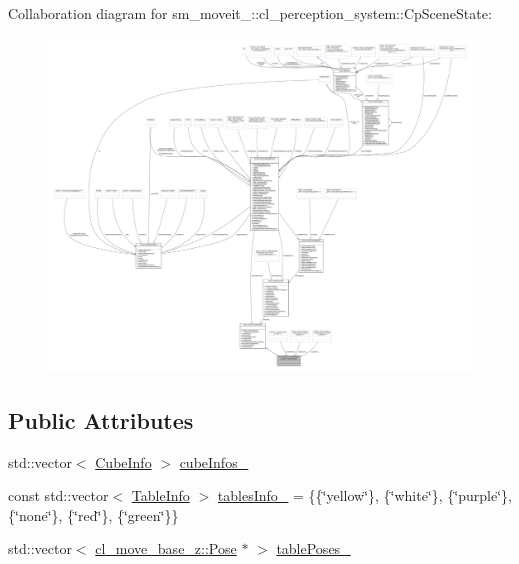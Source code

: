 Collaboration diagram for sm\+\_\+moveit\+\_\+:\+:cl\+\_\+perception\+\_\+system\+:\+:Cp\+Scene\+State\+:
\nopagebreak
\begin{figure}[H]
\begin{center}
\leavevmode
\includegraphics[width=350pt]{classsm__moveit__4_1_1cl__perception__system_1_1CpSceneState__coll__graph}
\end{center}
\end{figure}
\subsection*{Public Attributes}
\begin{DoxyCompactItemize}
\item 
std\+::vector$<$ \hyperlink{structsm__moveit__4_1_1cl__perception__system_1_1CubeInfo}{Cube\+Info} $>$ \hyperlink{classsm__moveit__4_1_1cl__perception__system_1_1CpSceneState_a734a45934cccf19ac5c886cd94bc8cda}{cube\+Infos\+\_\+}
\item 
const std\+::vector$<$ \hyperlink{structsm__moveit__4_1_1cl__perception__system_1_1TableInfo}{Table\+Info} $>$ \hyperlink{classsm__moveit__4_1_1cl__perception__system_1_1CpSceneState_ab579f3b2eaf29cfd239944f41693e6c3}{tables\+Info\+\_\+} = \{\{\char`\"{}yellow\char`\"{}\}, \{\char`\"{}white\char`\"{}\}, \{\char`\"{}purple\char`\"{}\}, \{\char`\"{}none\char`\"{}\}, \{\char`\"{}red\char`\"{}\}, \{\char`\"{}green\char`\"{}\}\}
\item 
std\+::vector$<$ \hyperlink{classcl__move__base__z_1_1Pose}{cl\+\_\+move\+\_\+base\+\_\+z\+::\+Pose} $\ast$ $>$ \hyperlink{classsm__moveit__4_1_1cl__perception__system_1_1CpSceneState_a4becce67e327e0364bcb8c2b796deade}{table\+Poses\+\_\+}
\end{DoxyCompactItemize}
